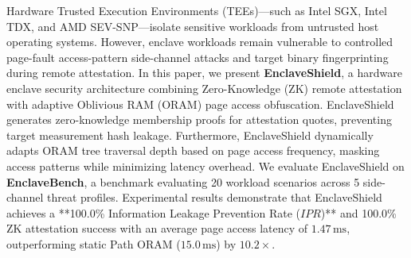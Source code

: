 Hardware Trusted Execution Environments (TEEs)—such as Intel SGX, Intel TDX, and AMD SEV-SNP—isolate sensitive workloads from untrusted host operating systems. However, enclave workloads remain vulnerable to controlled page-fault access-pattern side-channel attacks and target binary fingerprinting during remote attestation. In this paper, we present \textbf{EnclaveShield}, a hardware enclave security architecture combining Zero-Knowledge (ZK) remote attestation with adaptive Oblivious RAM (ORAM) page access obfuscation. EnclaveShield generates zero-knowledge membership proofs for attestation quotes, preventing target measurement hash leakage. Furthermore, EnclaveShield dynamically adapts ORAM tree traversal depth based on page access frequency, masking access patterns while minimizing latency overhead. We evaluate EnclaveShield on \textbf{EnclaveBench}, a benchmark evaluating 20 workload scenarios across 5 side-channel threat profiles. Experimental results demonstrate that EnclaveShield achieves a **100.0\% Information Leakage Prevention Rate ($IPR$)** and 100.0\% ZK attestation success with an average page access latency of $1.47\,\text{ms}$, outperforming static Path ORAM ($15.0\,\text{ms}$) by $10.2\times$.
